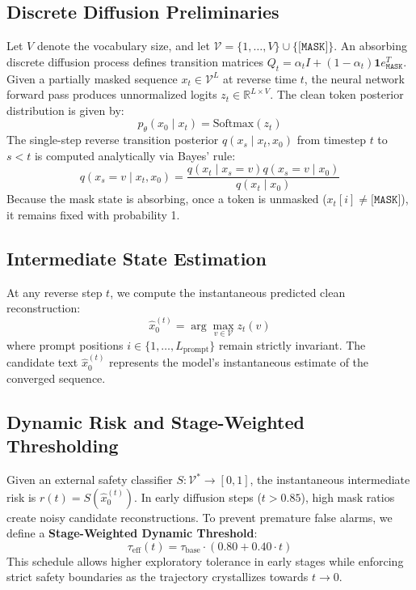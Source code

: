 \documentclass[conference]{IEEEtran}
\begin{document}
\subsection{Discrete Diffusion Preliminaries}
Let $V$ denote the vocabulary size, and let $\mathcal{V} = \{1, \dots, V\} \cup \{\texttt{[MASK]}\}$. An absorbing discrete diffusion process defines transition matrices $Q_t = \alpha_t I + (1 - \alpha_t) \mathbf{1} e_{\texttt{MASK}}^T$. Given a partially masked sequence $x_t \in \mathcal{V}^L$ at reverse time $t$, the neural network forward pass produces unnormalized logits $z_t \in \mathbb{R}^{L \times V}$. The clean token posterior distribution is given by:
\begin{equation}
p_\theta(x_0 \mid x_t) = \text{Softmax}(z_t)
\end{equation}
The single-step reverse transition posterior $q(x_s \mid x_t, x_0)$ from timestep $t$ to $s < t$ is computed analytically via Bayes' rule:
\begin{equation}
q(x_s = v \mid x_t, x_0) = \frac{q(x_t \mid x_s = v) q(x_s = v \mid x_0)}{q(x_t \mid x_0)}
\end{equation}
Because the mask state is absorbing, once a token is unmasked ($x_t[i] \ne \texttt{[MASK]}$), it remains fixed with probability 1.

\subsection{Intermediate State Estimation}
At any reverse step $t$, we compute the instantaneous predicted clean reconstruction:
\begin{equation}
\hat{x}_0^{(t)} = \arg\max_{v \in \mathcal{V}} z_t(v)
\end{equation}
where prompt positions $i \in \{1, \dots, L_{\text{prompt}}\}$ remain strictly invariant. The candidate text $\hat{x}_0^{(t)}$ represents the model's instantaneous estimate of the converged sequence.

\subsection{Dynamic Risk and Stage-Weighted Thresholding}
Given an external safety classifier $S: \mathcal{V}^* \to [0, 1]$, the instantaneous intermediate risk is $r(t) = S(\hat{x}_0^{(t)})$. In early diffusion steps ($t > 0.85$), high mask ratios create noisy candidate reconstructions. To prevent premature false alarms, we define a \textbf{Stage-Weighted Dynamic Threshold}:
\begin{equation}
\tau_{\text{eff}}(t) = \tau_{\text{base}} \cdot \left(0.80 + 0.40 \cdot t\right)
\end{equation}
This schedule allows higher exploratory tolerance in early stages while enforcing strict safety boundaries as the trajectory crystallizes towards $t \to 0$.
\end{document}
